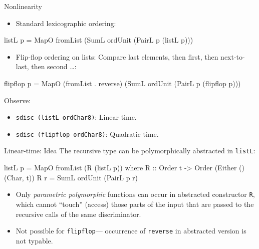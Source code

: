 \documentclass{beamer}
\begin{document}
\begin{frame}[fragile]{Nonlinearity}
  \begin{itemize}
  \item Standard lexicographic ordering:
  \end{itemize}
\begin{haskell}
listL p = MapO fromList
             (SumL ordUnit (PairL p (listL p)))
\end{haskell}
  \begin{itemize}
  \item Flip-flop ordering on lists: Compare last elements, then first, then
    next-to-last, then second \ldots:
  \end{itemize}
\begin{haskell}
flipflop p = MapO (fromList . reverse)
             (SumL ordUnit (PairL p (flipflop p)))
\end{haskell}
  Observe:
  \begin{itemize}
  \item \lstinline|sdisc (listL ordChar8)|: Linear time.
  \item \lstinline|sdisc (flipflop ordChar8)|: Quadratic time.
  \end{itemize}
\end{frame}

\begin{frame}[fragile]{Linear-time: Idea}
  The recursive type can be polymorphically abstracted in \lstinline|listL|:
\begin{haskell}
listL p = MapO fromList
          (R (listL p))
  where R :: Order t -> Order (Either () (Char, t))
        R r = SumL ordUnit (PairL p r)
\end{haskell}
  \begin{itemize}
  \item Only \emph{parametric polymorphic} functions can occur in abstracted
    constructor \lstinline|R|, which cannot ``touch'' (access) those parts of the
    input that are passed to the recursive calls of the same discriminator.
  \item Not possible for \lstinline|flipflop|--- occurrence of \lstinline|reverse| in
    abstracted version is not typable.
  \end{itemize}
\end{frame}
\end{document}

